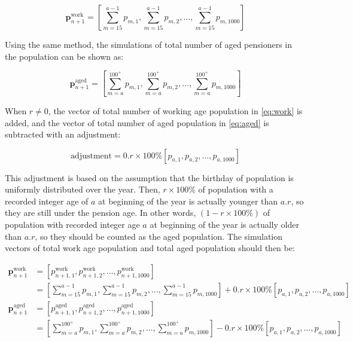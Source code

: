\documentclass[11pt,a4paper,]{article}
\begin{document}
\begin{equation}
  \bm{p}^{\text{work}}_{n+1} = \left[\sum_{m=15}^{a-1}p_{m,1},\sum_{m=15}^{a-1}p_{m,2},\dots,\sum_{m=15}^{a-1}p_{m,1000}\right] \label{eq:work}
\end{equation}

Using the same method, the simulations of total number of aged
pensioners in the population can be shown as:

\begin{equation}
  \bm{p}^{\text{aged}}_{n+1} = \left[\sum_{m=a}^{100^+}p_{m,1},\sum_{m=a}^{100^+}p_{m,2},\dots,\sum_{m=a}^{100^+}p_{m,1000}\right]\label{eq:aged}
\end{equation}

When \(r\neq0\), the vector of total number of working age population in
\eqref{eq:work} is added, and the vector of total number of aged
population in \eqref{eq:aged} is subtracted with an adjustment:
\vspace{-.2in}

\begin{equation}
  \text{adjustment}=0.r\times100\%[p_{a,1},p_{a,2},\dots,p_{a,1000}]
\end{equation}

This adjustment is based on the assumption that the birthday of
population is uniformly distributed over the year. Then,
\(r\times100\%\) of population with a recorded integer age of \(a\) at
beginning of the year is actually younger than \(a.r\), so they are
still under the pension age. In other words, \((1-r\times100\%)\) of
population with recorded integer age \(a\) at beginning of the year is
actually older than \(a.r\), so they should be counted as the aged
population. The simulation vectors of total work age population and
total aged population should then be:

\begin{align*}
  \bm{p}^{\text{work}}_{n+1}
    & = \left[p^{\text{work}}_{n+1,1},p^{\text{work}}_{n+1,2},\dots,p^{\text{work}}_{n+1,1000}\right]\\
    & = \left[\sum_{m=15}^{a-1}p_{m,1},\sum_{m=15}^{a-1}p_{m,2},\dots,\sum_{m=15}^{a-1}p_{m,1000}\right]+0.r\times100\%\left[p_{a,1},p_{a,2},\dots,p_{a,1000}\right]   \\
  \bm{p}^{\text{aged}}_{n+1}
    & = \left[p^{\text{aged}}_{n+1,1},p^{\text{aged}}_{n+1,2},\dots,p^{\text{aged}}_{n+1,1000}\right]\\
    & = \left[\sum_{m=a}^{100^+}p_{m,1},\sum_{m=a}^{100^+}p_{m,2},\dots,\sum_{m=a}^{100^+}p_{m,1000}\right]-0.r\times100\%\left[p_{a,1},p_{a,2},\dots,p_{a,1000}\right]
\end{align*}
\end{document}
